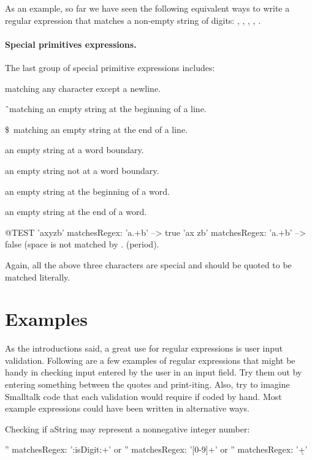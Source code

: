 \documentclass[a4paper,10pt,twoside]{book}
\begin{document}
{As an example, so far we have seen the following equivalent ways to write a regular expression that matches a non-empty string of digits: \ct{[0-9]+}, \ct{\d+}, \ct{[\d]+}, \ct{[[:digit:]+} , .

\paragraph{Special primitives expressions.} 
The last group of special primitive expressions includes:  	

\begin{description}
\item {}	matching any character except a newline.  
\item \^\  	matching an empty string at the beginning of a line.  
\item \$\	matching an empty string at the end of a line. 	
\item \ct{\b} an empty string at a word boundary. 	
\item \ct{\B} an empty string not at a word boundary. 	
\item \ct{\<} an empty string at the beginning of a word. 	
\item \ct{\>} an empty string at the end of a word. 
\end{description}

\begin{code}{@TEST}
'axyzb' matchesRegex: 'a.+b' --> true 	
'ax zb' matchesRegex: 'a.+b' --> false     (space is not matched by . (period). 
\end{code}

Again, all the above three characters are special and should be quoted to be matched literally. 	

\section{Examples} 

As the introductions said, a great use for regular expressions is user input validation. Following are a few examples of regular expressions that might be handy in checking input entered by the user in an input field. Try them out by entering something between the quotes and print-iting. Also, try to imagine Smalltalk code that each validation would require if coded by hand.  Most example expressions could have been written in alternative ways.


 Checking if aString may represent a nonnegative integer number: 
 \begin{code}	
 '' matchesRegex: ':isDigit:+' or 	
 '' matchesRegex: '[0-9]+' or 	
 '' matchesRegex: '\d+' 
 \end{code}
 
}
\end{document}
